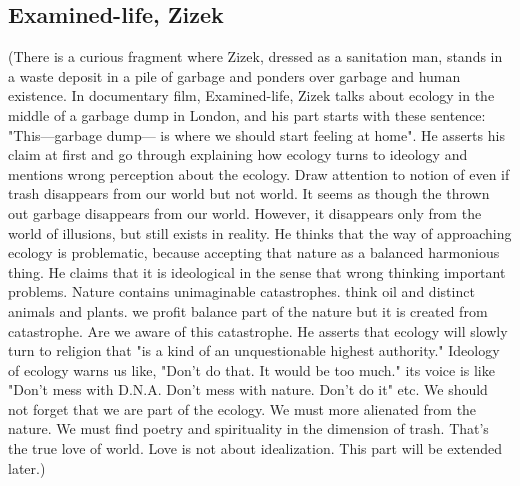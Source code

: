 \subsection{Examined-life, Zizek}
(There is a curious fragment where Zizek, dressed as a sanitation man, stands in a waste deposit in a pile of garbage and ponders over garbage and human existence. In documentary film, Examined-life, Zizek talks about ecology in the middle of a garbage dump in London, and his part starts with these sentence: "This---garbage dump--- is where we should start feeling at home". He asserts his claim at first and go through explaining how ecology turns to ideology and mentions wrong perception about the ecology. Draw attention to notion of even if trash disappears from our world but not world. It seems as though the thrown out garbage disappears from our world. However, it disappears only from the world of illusions, but still exists in reality. He thinks that the way of approaching ecology is problematic, because accepting that nature as a balanced harmonious thing. He claims that it is ideological in the sense that wrong thinking important problems. Nature contains unimaginable catastrophes. think oil and distinct animals and plants. we profit balance part of the nature but it is created from catastrophe. Are we aware of this catastrophe. He asserts that ecology will slowly turn to religion that "is a kind of an unquestionable highest authority." Ideology of ecology warns us like, "Don't do that. It would be too much." its voice is like "Don't mess with D.N.A. Don't mess with nature. Don't do it" etc. We should not forget that we are part of the ecology. We must more alienated from the nature. We must find poetry and spirituality in the dimension of trash. That's the true love of world. Love is not about idealization. This part will be extended later.)

 \cite{vafin2012zizek}

